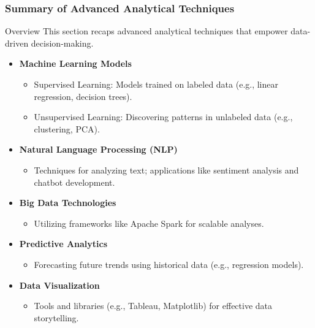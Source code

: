 \documentclass[aspectratio=169]{beamer}
\begin{document}
\begin{frame}[fragile]
    \frametitle{Summary of Advanced Analytical Techniques}
    \begin{block}{Overview}
        This section recaps advanced analytical techniques that empower data-driven decision-making.
    \end{block}
    \begin{itemize}
        \item \textbf{Machine Learning Models}
            \begin{itemize}
                \item Supervised Learning: Models trained on labeled data (e.g., linear regression, decision trees).
                \item Unsupervised Learning: Discovering patterns in unlabeled data (e.g., clustering, PCA).
            \end{itemize}
        \item \textbf{Natural Language Processing (NLP)}
            \begin{itemize}
                \item Techniques for analyzing text; applications like sentiment analysis and chatbot development.
            \end{itemize}
        \item \textbf{Big Data Technologies}
            \begin{itemize}
                \item Utilizing frameworks like Apache Spark for scalable analyses.
            \end{itemize}
        \item \textbf{Predictive Analytics}
            \begin{itemize}
                \item Forecasting future trends using historical data (e.g., regression models).
            \end{itemize}
        \item \textbf{Data Visualization}
            \begin{itemize}
                \item Tools and libraries (e.g., Tableau, Matplotlib) for effective data storytelling.
            \end{itemize}
    \end{itemize}
\end{frame}
\end{document}
